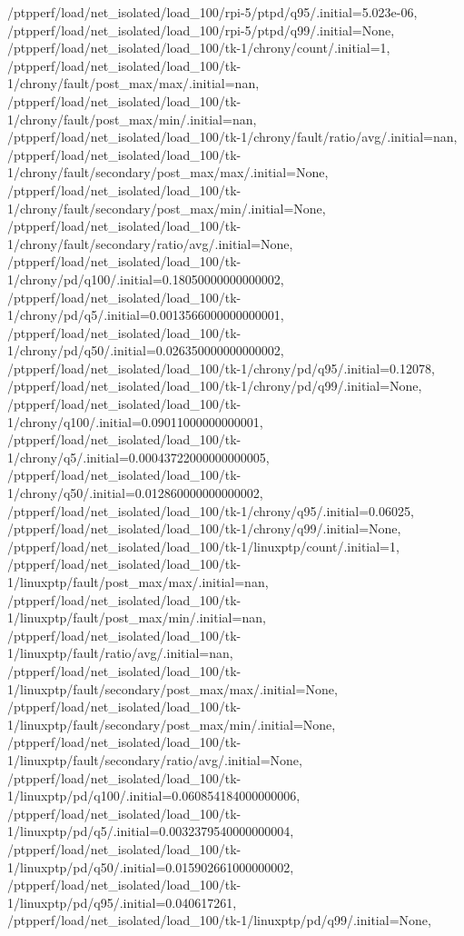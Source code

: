 {    /ptpperf/load/net_isolated/load_100/rpi-5/ptpd/q95/.initial=5.023e-06,
    /ptpperf/load/net_isolated/load_100/rpi-5/ptpd/q99/.initial=None,
    /ptpperf/load/net_isolated/load_100/tk-1/chrony/count/.initial=1,
    /ptpperf/load/net_isolated/load_100/tk-1/chrony/fault/post_max/max/.initial=nan,
    /ptpperf/load/net_isolated/load_100/tk-1/chrony/fault/post_max/min/.initial=nan,
    /ptpperf/load/net_isolated/load_100/tk-1/chrony/fault/ratio/avg/.initial=nan,
    /ptpperf/load/net_isolated/load_100/tk-1/chrony/fault/secondary/post_max/max/.initial=None,
    /ptpperf/load/net_isolated/load_100/tk-1/chrony/fault/secondary/post_max/min/.initial=None,
    /ptpperf/load/net_isolated/load_100/tk-1/chrony/fault/secondary/ratio/avg/.initial=None,
    /ptpperf/load/net_isolated/load_100/tk-1/chrony/pd/q100/.initial=0.18050000000000002,
    /ptpperf/load/net_isolated/load_100/tk-1/chrony/pd/q5/.initial=0.0013566000000000001,
    /ptpperf/load/net_isolated/load_100/tk-1/chrony/pd/q50/.initial=0.026350000000000002,
    /ptpperf/load/net_isolated/load_100/tk-1/chrony/pd/q95/.initial=0.12078,
    /ptpperf/load/net_isolated/load_100/tk-1/chrony/pd/q99/.initial=None,
    /ptpperf/load/net_isolated/load_100/tk-1/chrony/q100/.initial=0.09011000000000001,
    /ptpperf/load/net_isolated/load_100/tk-1/chrony/q5/.initial=0.00043722000000000005,
    /ptpperf/load/net_isolated/load_100/tk-1/chrony/q50/.initial=0.012860000000000002,
    /ptpperf/load/net_isolated/load_100/tk-1/chrony/q95/.initial=0.06025,
    /ptpperf/load/net_isolated/load_100/tk-1/chrony/q99/.initial=None,
    /ptpperf/load/net_isolated/load_100/tk-1/linuxptp/count/.initial=1,
    /ptpperf/load/net_isolated/load_100/tk-1/linuxptp/fault/post_max/max/.initial=nan,
    /ptpperf/load/net_isolated/load_100/tk-1/linuxptp/fault/post_max/min/.initial=nan,
    /ptpperf/load/net_isolated/load_100/tk-1/linuxptp/fault/ratio/avg/.initial=nan,
    /ptpperf/load/net_isolated/load_100/tk-1/linuxptp/fault/secondary/post_max/max/.initial=None,
    /ptpperf/load/net_isolated/load_100/tk-1/linuxptp/fault/secondary/post_max/min/.initial=None,
    /ptpperf/load/net_isolated/load_100/tk-1/linuxptp/fault/secondary/ratio/avg/.initial=None,
    /ptpperf/load/net_isolated/load_100/tk-1/linuxptp/pd/q100/.initial=0.060854184000000006,
    /ptpperf/load/net_isolated/load_100/tk-1/linuxptp/pd/q5/.initial=0.0032379540000000004,
    /ptpperf/load/net_isolated/load_100/tk-1/linuxptp/pd/q50/.initial=0.015902661000000002,
    /ptpperf/load/net_isolated/load_100/tk-1/linuxptp/pd/q95/.initial=0.040617261,
    /ptpperf/load/net_isolated/load_100/tk-1/linuxptp/pd/q99/.initial=None,
}
